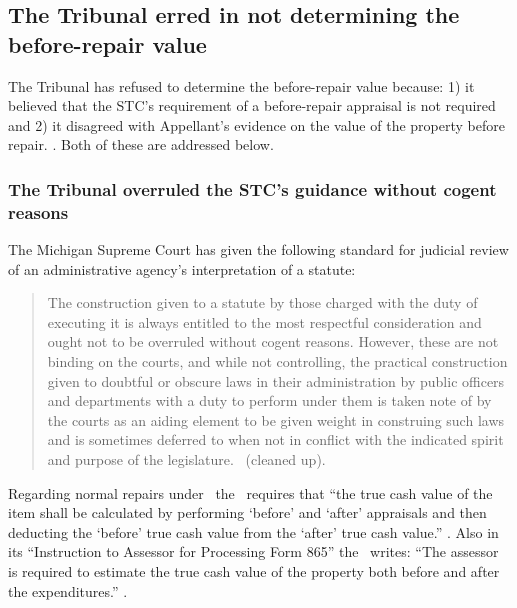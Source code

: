 \documentclass[12pt,\documentclassflag]{michiganCourtOfAppealsBrief}
\begin{document}
\subsection{The Tribunal erred in not determining the before-repair value}

The Tribunal has refused to determine the before-repair value because:
1) it believed that the STC's requirement of a before-repair appraisal is not required
and
2) it disagreed with Appellant's evidence on the value of the property before repair.
\reconsiderationDenied[2]. Both of these are addressed below.

\subsubsection{The Tribunal overruled the STC's guidance
  without cogent reasons}
  

The Michigan Supreme Court has given the following standard for judicial review of an administrative agency's interpretation of a statute:

\begin{quote}
The construction given to a statute by those charged with the duty of executing it is always entitled to the most respectful consideration and ought not to be overruled without cogent reasons. However, these are not binding on the courts, and while not controlling, the practical construction given to doubtful or obscure laws in their administration by public officers and departments with a duty to perform under them is taken note of by the courts as an aiding element to be given weight in construing such laws and is sometimes deferred to when not in conflict with the indicated spirit and purpose of the legislature. \ (cleaned up).
\end{quote}

Regarding normal repairs under \mathieuGast\ the \STC\ requires that ``the true cash value of the item shall be calculated by performing `before' and `after' appraisals and then deducting the `before' true cash value from the `after' true cash value.'' . Also in its ``Instruction to Assessor for Processing Form 865'' the \STC\ writes:
 ``The assessor is required to estimate the true cash value of the property both before and after the expenditures.'' \stcform[2].


\end{document}
